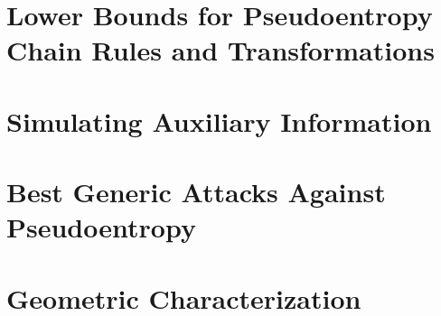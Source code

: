 \documentclass[12pt]{report}
\begin{document}
\chapter{Lower Bounds for Pseudoentropy Chain Rules and Transformations}


\chapter{Simulating Auxiliary Information}



\chapter{Best Generic Attacks Against Pseudoentropy}


\chapter{Geometric Characterization}

\end{document}
